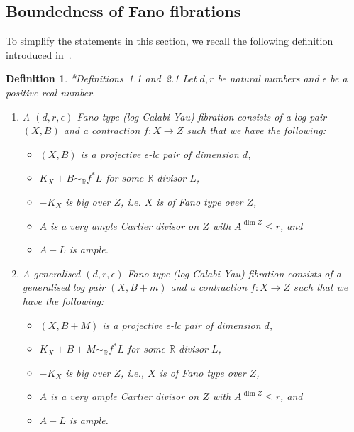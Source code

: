 \documentclass[11pt]{ip-journal}
\newtheorem{definition}[theorem]{Definition}
\theoremstyle{definition}
\begin{document}
\subsection{Boundedness of Fano fibrations}

To simplify the statements in this section, we recall the following definition introduced in~\cite{1811.107092}. 

\begin{definition}
\cite{1811.107092}*{Definitions~1.1 and~2.1} 
\label{fano-fibr.def}
Let 
$d,r$ 
be natural numbers and 
$\epsilon$ 
be a positive real number. 
\begin{enumerate}
	\item 
A 
\emph{$(d,r,\epsilon)$-Fano 
type (log Calabi-Yau) fibration} consists of a log  pair 
$(X,B)$ 
and a contraction 
$f\colon X\to Z$ 
such that we have the following:
\begin{itemize}
	\item 
$(X,B)$ 
is a projective 
$\epsilon$-lc 
pair of dimension 
$d$,

	\item 
$K_X+B\sim_\mathbb{R} f^\ast L$ 
for some 
$\mathbb{R}$-divisor 
$L$, 

\item $-K_X$ is big over  $Z$, i.e. $X$ is of Fano type over $Z$,

\item $A$ is a very ample Cartier divisor on $Z$ with $A^{\dim Z}\le r$, and 

\item $A-L$ is ample.
\end{itemize}
\item 
A generalised
\emph{$(d,r,\epsilon)$-Fano 
type (log Calabi-Yau) fibration} consists of a generalised log  pair 
$(X,B+m)$ 
and a contraction 
$f\colon X\to Z$ 
such that we have the following:
\begin{itemize}
	\item 
$(X,B+M)$ 
is a projective 
$\epsilon$-lc 
pair of dimension 
$d$,

	\item 
$K_X+B+M\sim_\mathbb{R} f^\ast L$ 
for some 
$\mathbb{R}$-divisor 
$L$, 

	\item 
$-K_X$ 
is big over
$Z$, 
i.e., 
$X$ 
is of Fano type over 
$Z$,

	\item 
$A$ 
is a very ample Cartier divisor on 
$Z$ 
with 
$A^{\dim Z}\le r$, 
and 

	\item 
$A-L$ 
is ample.
\end{itemize}
\end{enumerate}
\end{definition}
\end{document}

